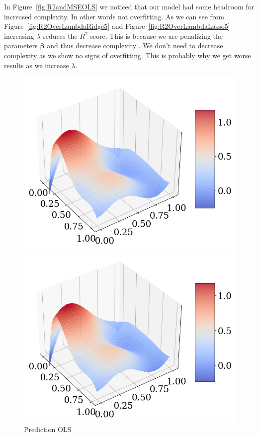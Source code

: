 \documentclass[twoside,11pt]{report}
\begin{document}
In Figure~\ref{fig:R2andMSEOLS} we noticed that our model had some headroom for increased complexity. In
other words not overfitting. As we can see from Figure~\ref{fig:R2OverLambdaRidge5} and Figure~\ref{fig:R2OverLambdaLasso5}
increasing $\lambda$ reduces the $R^2$ score. This is because we are penalizing the parameters $\boldsymbol{\beta}$ and thus
decrease complexity . We don't need to decrease complexity as we show no signs of overfitting. 
This is probably why we get worse results as we increase $\lambda$.

\begin{figure}[h]
\begin{minipage}[!t]{.48\linewidth}
    \begin{center}
        \includegraphics[width=1.0\textwidth]{../runsAndAdditions/predictionOLS.png}
        \caption{Prediction OLS}\label{fig:predictionOLS}
\end{center}
\end{minipage}
\hspace{4mm}
\begin{minipage}[!t]{.48\linewidth}
    \begin{center}
        \includegraphics[width=1.0\textwidth]{../runsAndAdditions/predictionRidge.png}

\end{center}
\end{minipage}
\end{figure}
\end{document}
